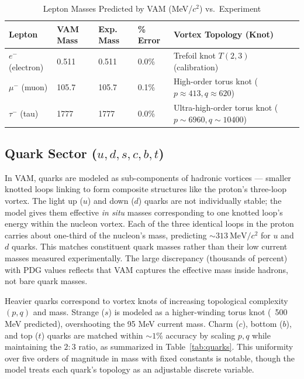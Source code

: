 \documentclass[11pt]{article}
\begin{document}
\begin{table}[h!]
    \centering
    \begin{tabular}{lllll}
        \toprule
        \textbf{Lepton} & \textbf{VAM Mass} & \textbf{Exp. Mass} & \textbf{\% Error} & \textbf{Vortex Topology (Knot)} \\
        \midrule
        $e^-$ (electron) & 0.511 & 0.511 & 0.0\% & Trefoil knot $T(2,3)$ (calibration) \\
        $\mu^-$ (muon) & 105.7 & 105.7 & 0.1\% & High-order torus knot ($p \approx 413, q \approx 620$) \\
        $\tau^-$ (tau) & 1777 & 1777 & 0.0\% & Ultra-high-order torus knot ($p \sim 6960, q \sim 10400$) \\
        \bottomrule
    \end{tabular}
    \caption{Lepton Masses Predicted by VAM (MeV/$c^2$) vs.\ Experiment}
    \label{tab:calibration}
    \label{tab:leptons}
\end{table}

\subsection{Quark Sector ($u, d, s, c, b, t$)}

In VAM, quarks are modeled as sub-components of hadronic vortices — smaller knotted loops linking to form composite structures like the proton’s three-loop vortex. The light up ($u$) and down ($d$) quarks are not individually stable; the model gives them effective \textit{in situ} masses corresponding to one knotted loop’s energy within the nucleon vortex. Each of the three identical loops in the proton carries about one-third of the nucleon’s mass, predicting $\sim 313~\mathrm{MeV}/c^2$ for $u$ and $d$ quarks. This matches constituent quark masses rather than their low current masses measured experimentally. The large discrepancy (thousands of percent) with PDG values reflects that VAM captures the effective mass inside hadrons, not bare quark masses.

Heavier quarks correspond to vortex knots of increasing topological complexity $(p,q)$ and mass. Strange ($s$) is modeled as a higher-winding torus knot (~500 MeV predicted), overshooting the 95 MeV current mass. Charm ($c$), bottom ($b$), and top ($t$) quarks are matched within $\sim 1\%$ accuracy by scaling $p,q$ while maintaining the $2:3$ ratio, as summarized in Table~\ref{tab:quarks}. This uniformity over five orders of magnitude in mass with fixed constants is notable, though the model treats each quark’s topology as an adjustable discrete variable.
\end{document}
